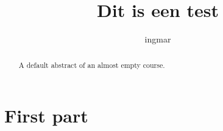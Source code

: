 \documentclass{xourse}
\title{Dit is een test}
\author{ingmar}
\begin{document}
\begin{abstract}
    A default abstract of an almost empty course.
\end{abstract}
\maketitle

\part{First part}

\end{document}
